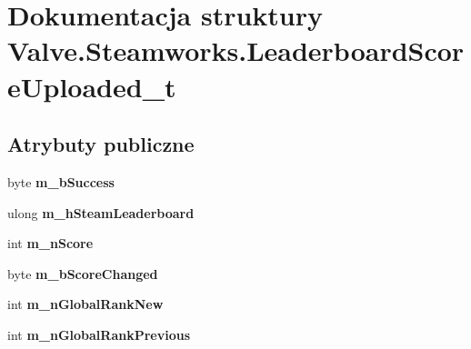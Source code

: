 \hypertarget{struct_valve_1_1_steamworks_1_1_leaderboard_score_uploaded__t}{}\section{Dokumentacja struktury Valve.\+Steamworks.\+Leaderboard\+Score\+Uploaded\+\_\+t}
\label{struct_valve_1_1_steamworks_1_1_leaderboard_score_uploaded__t}
\subsection*{Atrybuty publiczne}
\begin{DoxyCompactItemize}
\item 
\mbox{\label{struct_valve_1_1_steamworks_1_1_leaderboard_score_uploaded__t_a44464316ad03fe27f352e49e1d43ce62}} 
byte {\bfseries m\+\_\+b\+Success}
\item 
\mbox{\label{struct_valve_1_1_steamworks_1_1_leaderboard_score_uploaded__t_a7ca282b3004a3bec7619a514469cacb9}} 
ulong {\bfseries m\+\_\+h\+Steam\+Leaderboard}
\item 
\mbox{\label{struct_valve_1_1_steamworks_1_1_leaderboard_score_uploaded__t_a58b7c1f2a63ccf6526cef85563e87a95}} 
int {\bfseries m\+\_\+n\+Score}
\item 
\mbox{\label{struct_valve_1_1_steamworks_1_1_leaderboard_score_uploaded__t_a6aa605696d1873906c4acada953a395a}} 
byte {\bfseries m\+\_\+b\+Score\+Changed}
\item 
\mbox{\label{struct_valve_1_1_steamworks_1_1_leaderboard_score_uploaded__t_ab970df4e15f011e7d5622f75a4792c37}} 
int {\bfseries m\+\_\+n\+Global\+Rank\+New}
\item 
\mbox{\label{struct_valve_1_1_steamworks_1_1_leaderboard_score_uploaded__t_ad4eb8bc8cbec2cf843a46d2c8c4aba96}} 
int {\bfseries m\+\_\+n\+Global\+Rank\+Previous}
\end{DoxyCompactItemize}


